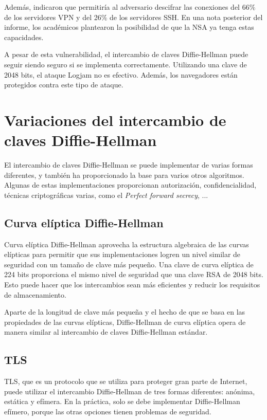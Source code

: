 \documentclass[11pt]{article}
\begin{document}
Además, indicaron que permitiría al adversario descifrar las conexiones del 66$\%$ de los servidores VPN y del 26$\%$ de los servidores SSH. En una nota posterior del informe, los académicos plantearon la posibilidad de que la NSA ya tenga estas capacidades.

A pesar de esta vulnerabilidad, el intercambio de claves Diffie-Hellman puede seguir siendo seguro si se implementa correctamente. Utilizando una clave de 2048 bits, el ataque Logjam no es efectivo. Además, los navegadores están protegidos contra este tipo de ataque.

\section{Variaciones del intercambio de claves Diffie-Hellman}

El intercambio de claves Diffie-Hellman se puede implementar de varias formas diferentes, y también ha proporcionado la base para varios otros algoritmos. Algunas de estas implementaciones proporcionan autorización, confidencialidad, técnicas criptográficas varias, como el \emph{Perfect forward secrecy}, ...

\subsection{Curva elíptica Diffie-Hellman}
Curva elíptica Diffie-Hellman aprovecha la estructura algebraica de las curvas elípticas para permitir que sus implementaciones logren un nivel similar de seguridad con un tamaño de clave más pequeño. Una clave de curva elíptica de 224 bits proporciona el mismo nivel de seguridad que una clave RSA de 2048 bits. Esto puede hacer que los intercambios sean más eficientes y reducir los requisitos de almacenamiento.

Aparte de la longitud de clave más pequeña y el hecho de que se basa en las propiedades de las curvas elípticas, Diffie-Hellman de curva elíptica opera de manera similar al intercambio de claves Diffie-Hellman estándar.

\subsection{TLS}

TLS, que es un protocolo que se utiliza para proteger gran parte de Internet, puede utilizar el intercambio Diffie-Hellman de tres formas diferentes: anónima, estática y efímera. En la práctica, solo se debe implementar Diffie-Hellman efímero, porque las otras opciones tienen problemas de seguridad.
\end{document}
